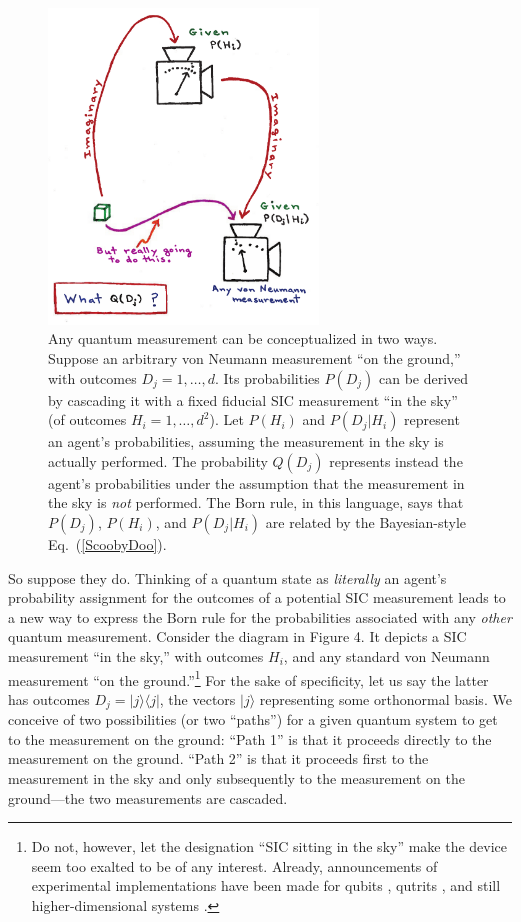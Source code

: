 \documentclass[aps,pra,superscriptaddress,12pt,tightenlines,nofootinbib]{revtex4-2}
\begin{document}
\begin{figure}
\begin{center}
\includegraphics[height=3.3in]{diagram-new}
\bigskip\caption{ Any quantum measurement can be conceptualized in two ways.
Suppose an arbitrary von Neumann measurement ``on the ground,'' with outcomes $D_j=1,\ldots,d$. Its probabilities $P(D_j)$ can be derived by cascading it with a fixed fiducial SIC measurement ``in the sky'' (of outcomes $H_i=1,\ldots,d^2$). Let $P(H_i)$ and $P(D_j|H_i)$ represent an agent's probabilities, assuming the measurement in the sky is actually performed. The probability $Q(D_j)$ represents instead the agent's probabilities under the assumption that the measurement in the sky is {\it not\/} performed. The Born rule, in this language, says that $P(D_j)$, $P(H_i)$, and $P(D_j|H_i)$ are related by the Bayesian-style Eq.~(\ref{ScoobyDoo}).}
\end{center}
\end{figure}

So suppose they do.  Thinking of a quantum state as {\it literally\/} an agent's probability assignment for the outcomes of a potential SIC measurement leads to a new way to express the Born rule for the probabilities associated with any {\it other\/} quantum measurement.  Consider the diagram in Figure 4.  It depicts a SIC measurement ``in the sky,'' with outcomes $H_i$, and any standard von Neumann measurement ``on the ground.''\footnote{Do not, however, let the designation ``SIC sitting in the sky'' make the device seem too exalted to be of any interest.  Already, announcements of experimental implementations have been made for qubits \cite{Ling06}, qutrits \cite{Medendorp10}, and still higher-dimensional systems \cite{BoydLeuchs}.}  For the sake of specificity, let us say the latter has outcomes $D_j=|j\rangle\langle j|$, the vectors $|j\rangle$ representing some orthonormal basis.  We conceive of two possibilities (or two ``paths'') for a given quantum system to get to the measurement on the ground:  ``Path 1'' is that it proceeds directly to the measurement on the ground.  ``Path 2'' is that it proceeds first to the measurement in the sky and only subsequently to the measurement on the ground---the two measurements are cascaded.
\end{document}
